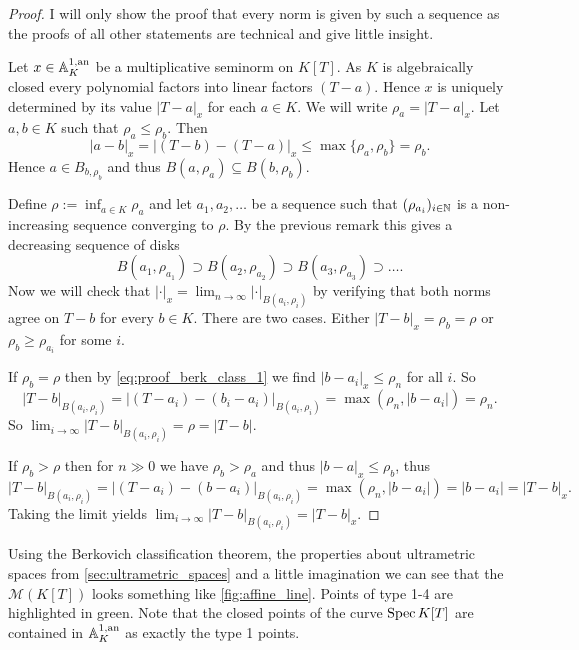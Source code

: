 \begin{proof}
	I will only show the proof that every norm is given by such a sequence as the proofs of all other statements are technical and give little insight. 

	Let $x \in \mathbb{A}_K^{1, \text{an}}$ be a multiplicative seminorm on $K[T]$. 
	As  $K$ is algebraically closed every polynomial factors into linear factors $(T-a)$. 
	Hence $x$ is uniquely determined by its value $|T-a|_x$ for each $a \in K$. 
	We will write $\rho_a = |T-a|_x$.
	Let  $a, b \in K$ such that $\rho_a \le \rho_b$. 
	Then  \begin{equation}\label{eq:proof_berk_class_1}
		|a - b|_x = |(T-b) - (T - a)|_x \le \max \{\rho_a, \rho_b\} = \rho_b 
	.\end{equation} 
	Hence $a \in B_{b, \rho_b}$ and thus  $B(a, \rho_a) \subseteq B(b, \rho_b)$. 

	Define $\rho := \inf_{a \in K} \rho_a$ and let $a_1, a_2, \ldots$ be a sequence such that $(\rho_{a_i})_{i \in \mathbb{N}}  $ is a non-increasing sequence converging to $\rho$. 
	By the previous remark this gives a decreasing sequence of disks \[
		B(a_1, \rho_{a_1}) \supset B(a_2, \rho_{a_2}) \supset B(a_3, \rho_{a_3}) \supset\ldots
	.\] 
	Now we will check that $|\cdot |_x = \lim_{n \to \infty} |\cdot |_{B(a_i, \rho_i)}$ by verifying that both norms agree on $T- b$ for every $b \in K$. 
	 There are two cases. Either $|T - b|_x = \rho_b = \rho$ or $\rho_b \ge \rho_{a_i}$ for some $i$. 

	 If $ \rho_b = \rho$ then by \eqref{eq:proof_berk_class_1} we find $|b - a_i|_x \le \rho_n$ for all $i$.
	 So \[
		 |T - b|_{B(a_i, \rho_i)} = |(T - a_i) - (b_i - a_i)|_{B(a_i, \rho_i)} = \max(\rho_n, |b - a_i|) = \rho_n
	 .\]
	 So $\lim_{i \to \infty} |T- b|_{B(a_i, \rho_i)} = \rho = |T - b|$. 

	 If $\rho_b > \rho$ then for $n \gg 0$ we have $\rho_b > \rho_a$ and thus $|b - a|_x \le \rho_b$, thus \[
		 |T - b|_{B(a_i, \rho_i)} = |(T - a_i) - (b -a_i)|_{B(a_i, \rho_i)} = \max (\rho_n, |b - a_i|) = |b - a_i| = |T - b|_x
	 .\]   
	 Taking the limit yields $\lim_{i \to \infty} |T- b| _{B(a_i, \rho_{i})} = |T - b|_x$.
\end{proof}

Using the Berkovich classification theorem, the properties about ultrametric spaces from \cref{sec:ultrametric_spaces} and a little imagination we can see that the $\mathcal{M} (K[T])$ looks something like \cref{fig:affine_line}. 
Points of type 1-4 are highlighted in green. Note that the closed points of the curve $\operatorname{Spec} K[T]$ are contained in  $\mathbb{A}_K^{1,\text{an}}$ as exactly the type 1 points. 

